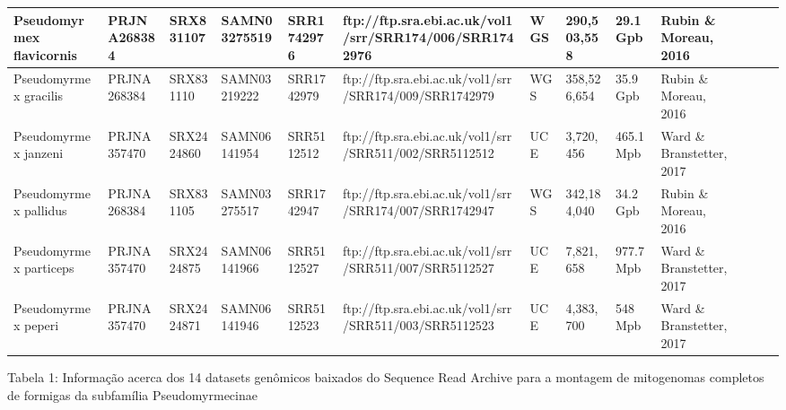 \documentclass[../DISSERTACAO_MAIN.tex]{subfiles}
\begin{document}
\begin{landscape}
{\begin{tabular}{| l | l | l | l | l | l | l | l | l | l | l | l | l |}
		Pseudomyrmex flavicornis & PRJNA268384 & SRX831107 & SAMN03275519 & SRR1742976 & ftp://ftp.sra.ebi.ac.uk/vol1/srr/SRR174/006/SRR1742976 & WGS & 290,503,558 & 29.1 Gpb & Rubin \& Moreau, 2016 \\ \hline

		Pseudomyrmex gracilis & PRJNA268384 & SRX831110 & SAMN03219222 & SRR1742979 & ftp://ftp.sra.ebi.ac.uk/vol1/srr/SRR174/009/SRR1742979 & WGS & 358,526,654 & 35.9 Gpb & Rubin \& Moreau, 2016 \\ \hline

		Pseudomyrmex janzeni & PRJNA357470 & SRX2424860 & SAMN06141954 & SRR5112512 & ftp://ftp.sra.ebi.ac.uk/vol1/srr/SRR511/002/SRR5112512 & UCE & 3,720,456 & 465.1 Mpb & Ward \& Branstetter, 2017 \\ \hline

		Pseudomyrmex pallidus & PRJNA268384 & SRX831105 & SAMN03275517 & SRR1742947 & ftp://ftp.sra.ebi.ac.uk/vol1/srr/SRR174/007/SRR1742947 & WGS & 342,184,040 & 34.2 Gpb & Rubin \& Moreau, 2016 \\ \hline

		Pseudomyrmex particeps & PRJNA357470 & SRX2424875 & SAMN06141966 & SRR5112527 & ftp://ftp.sra.ebi.ac.uk/vol1/srr/SRR511/007/SRR5112527 & UCE & 7,821,658 & 977.7 Mpb & Ward \& Branstetter, 2017 \\ \hline

		Pseudomyrmex peperi & PRJNA357470 & SRX2424871 & SAMN06141946 & SRR5112523 & ftp://ftp.sra.ebi.ac.uk/vol1/srr/SRR511/003/SRR5112523 & UCE & 4,383,700 & 548 Mpb & Ward \& Branstetter, 2017 \\ \hline

	\end{tabular} }
	
	Tabela 1: Informação acerca dos 14 datasets genômicos baixados do Sequence Read Archive para a montagem de mitogenomas completos de formigas da subfamília Pseudomyrmecinae
	
\end{landscape}
\end{document}
